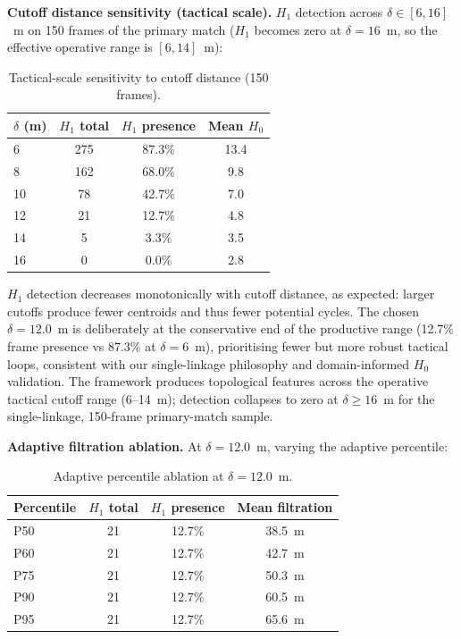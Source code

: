 \textbf{Cutoff distance sensitivity (tactical scale).} \(H_1\) detection across \(\delta\in[6,16]\)~m on 150 frames of the primary match ($H_1$ becomes zero at $\delta=16$~m, so the effective operative range is $[6,14]$~m):

\begin{table}[H]
  \centering
  \caption{Tactical-scale sensitivity to cutoff distance (150 frames).}
  \label{tab:senscut}
  \begin{tabular}{@{}lccc@{}}
    \toprule
    \(\delta\) (m) & \(H_1\) total & \(H_1\) presence & Mean \(H_0\) \\
    \midrule
    6  & 275 & 87.3\% & 13.4 \\
    8  & 162 & 68.0\% & 9.8 \\
    10 & 78 & 42.7\% & 7.0 \\
    12 & 21 & 12.7\% & 4.8 \\
    14 & 5 & 3.3\% & 3.5 \\
    16 & 0 & 0.0\% & 2.8 \\
    \bottomrule
  \end{tabular}
\end{table}

\(H_1\) detection decreases monotonically with cutoff distance, as expected: larger cutoffs produce fewer centroids and thus fewer potential cycles. The chosen \(\delta=12.0\)~m is deliberately at the conservative end of the productive range (12.7\% frame presence vs 87.3\% at \(\delta=6\)~m), prioritising fewer but more robust tactical loops, consistent with our single-linkage philosophy and domain-informed \(H_0\) validation. The framework produces topological features across the operative tactical cutoff range (6--14~m); detection collapses to zero at \(\delta \geq 16\)~m for the single-linkage, 150-frame primary-match sample.

\textbf{Adaptive filtration ablation.} At \(\delta=12.0\)~m, varying the adaptive percentile:

\begin{table}[H]
  \centering
  \caption{Adaptive percentile ablation at \(\delta=12.0\)~m.}
  \label{tab:sensp}
  \begin{tabular}{@{}lccc@{}}
    \toprule
    Percentile & \(H_1\) total & \(H_1\) presence & Mean filtration \\
    \midrule
    P50 & 21 & 12.7\% & 38.5~m \\
    P60 & 21 & 12.7\% & 42.7~m \\
    P75 & 21 & 12.7\% & 50.3~m \\
    P90 & 21 & 12.7\% & 60.5~m \\
    P95 & 21 & 12.7\% & 65.6~m \\
    \bottomrule
  \end{tabular}
\end{table}

